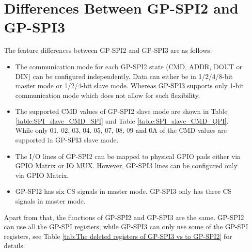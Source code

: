 \documentclass[main\_\_EN.tex]{subfiles}
\begin{document}
\section{Differences Between GP-SPI2 and GP-SPI3}\label{Subsection:Differences Between GP-SPI2 and GP-SPI3}
The feature differences between GP-SPI2 and GP-SPI3 are as follows:
\begin{itemize}
    \item The communication mode for each GP-SPI2 state (CMD, ADDR, DOUT or DIN) can be configured independently. Data can either be in 1/2/4/8-bit master mode or 1/2/4-bit slave mode. Whereas GP-SPI3 supports only 1-bit communication mode which does not allow for such flexibility.
    \item The supported CMD values of GP-SPI2 slave mode are shown in Table \ref{table:SPI_slave_CMD_SPI} and Table \ref{table:SPI_slave_CMD_QPI}. While only \hexprefix{}01, \hexprefix{}02, \hexprefix{}03, \hexprefix{}04, \hexprefix{}05, \hexprefix{}07, \hexprefix{}08, \hexprefix{}09 and \hexprefix{}0A of the CMD values are supported in GP-SPI3 slave mode.
    \item The I/O lines of GP-SPI2 can be mapped to physical GPIO pads either via GPIO Matrix or IO MUX. However, GP-SPI3 lines can be configured only via GPIO Matrix.
    \item GP-SPI2 has six CS signals in master mode. GP-SPI3 only has three CS signals in master mode.
\end{itemize}
Apart from that, the functions of GP-SPI2 and GP-SPI3 are the same. GP-SPI2 can use all the GP-SPI registers, while GP-SPI3 can only use some of the GP-SPI registers, see Table \ref{tab:The deleted registers of GP-SPI3 vs to GP-SPI2} for details.
\end{document}

